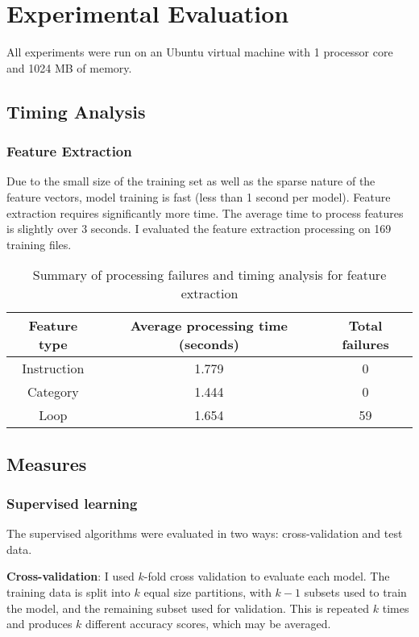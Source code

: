 \chapter{Experimental Evaluation}
All experiments were run on an Ubuntu virtual machine with 1 processor core and 1024 MB of memory.


\section{Timing Analysis}
\subsection{Feature Extraction}
Due to the small size of the training set as well as the sparse nature of the feature vectors, model training is fast (less than 1 second per model).  Feature extraction requires significantly more time.  The average time to process features is slightly over 3 seconds.  I evaluated the feature extraction processing on 169 training files.

\begin{center}
\begin{table}
\begin{tabular}{c|cc}
\textbf{Feature type} & \textbf{Average processing time (seconds)} & \textbf{Total failures}\\
\hline
Instruction & 1.779 & 0\\
Category & 1.444 & 0\\
Loop & 1.654 & 59
\end{tabular}
\label{featureprocessing}
\caption{Summary of processing failures and timing analysis for feature extraction}
\end{table}
\end{center}

\section{Measures}
\subsection{Supervised learning}
The supervised algorithms were evaluated in two ways: cross-validation and test data.

\textbf{Cross-validation}: I used $k$-fold cross validation to evaluate each model.  The training data is split into $k$ equal size partitions, with $k-1$ subsets used to train the model, and the remaining subset used for validation.  This is repeated $k$ times and produces $k$ different accuracy scores, which may be averaged.

